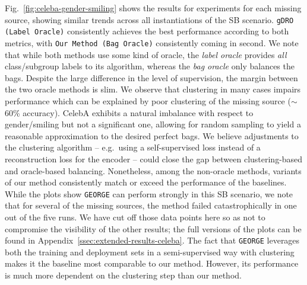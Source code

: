 Fig.~\ref{fig:celeba-gender-smiling} shows the results for experiments for each missing source,
showing similar trends across all instantiations of the SB scenario. 
%
\texttt{gDRO (Label Oracle)} consistently achieves the best performance according to both metrics,
with \texttt{Our Method (Bag Oracle)} consistently coming in second. 
%
We note that while both methods use some kind of oracle, the \emph{label oracle} provides
\emph{all} class/subgroup labels to its algorithm, whereas the \emph{bag oracle} only balances the
bags. 
%
Despite the large difference in the level of supervision, the margin between the two oracle methods
is slim. 
%
We observe that clustering in many cases impairs performance which can be explained by poor
clustering of the missing source ($\sim$60\% accuracy).
%
CelebA exhibits a natural imbalance with respect to gender/smiling but not a significant one,
allowing for random sampling to yield a reasonable approximation to the desired perfect bags. 
%
We believe adjustments to the clustering algorithm -- e.g.\ using a self-supervised loss instead of
a reconstruction loss for the encoder -- could close the gap between clustering-based and
oracle-based balancing. 
%
Nonetheless, among the non-oracle methods, variants of our method
consistently match or exceed the performance of the baselines. 
%
While the plots show \texttt{GEORGE} can perform strongly in this SB scenario, we note that for
several of the missing sources, the method failed catastrophically in one out of the five runs.
%
We have cut off those data points here so as not to compromise the visibility of the other results;
the full versions of the plots can be found in Appendix~\ref{ssec:extended-results-celeba}.
%
The fact that \texttt{GEORGE} leverages both the training and deployment sets in a semi-supervised
way with clustering makes it the baseline most comparable to our method.
%
However, its performance is much more dependent on the clustering step than our method.

